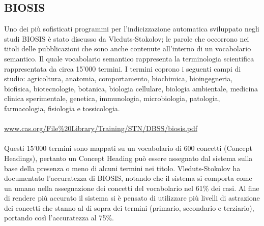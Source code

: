 \documentclass{article}
\theoremstyle{plain}
\theoremstyle{definition}
\begin{document}
\subsection{BIOSIS}
Uno dei più sofisticati programmi per l'indicizzazione automatica sviluppato negli studi BIOSIS è stato discusso da  Vleduts-Stokolov;  le parole che occorrono nei titoli delle pubblicazioni che sono anche contenute all'interno di un vocabolario semantico. Il quale vocabolario semantico rappresenta la terminologia scientifica rappresentata da circa 15'000 termini.
I termini coprono i seguenti campi di studio: agricoltura, anatomia, comportamento, biochimica, bioingegneria, biofisica, biotecnologie, botanica, biologia cellulare, biologia ambientale, medicina clinica sperimentale, genetica, immunologia, microbiologia, patologia, farmacologia, fisiologia e tossicologia.
\\
\\
\url{www.cas.org/File%20Library/Training/STN/DBSS/biosis.pdf}
\\
\\
Questi 15'000 termini sono mappati su un vocabolario di 600 concetti (Concept Headings), pertanto un Concept Heading può essere assegnato dal sistema sulla base della presenza o meno di alcuni termini nei titolo. Vleduts-Stokolov ha documentato l'accuratezza di BIOSIS, notando che il sistema si comporta come un umano nella assegnazione dei concetti del vocabolario nel 61\% dei casi. Al fine di rendere più accurato il sistema si è pensato di utilizzare più livelli di astrazione dei concetti che stanno al di sopra dei termini (primario, secondario e terziario), portando così l'accuratezza al 75\%.
\end{document}
